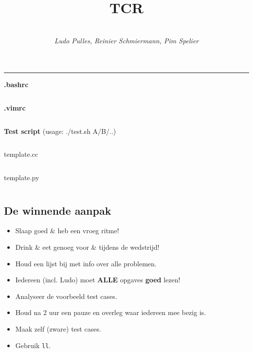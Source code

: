 \documentclass[8pt,a4paper,landscape,oneside]{amsart}
\title{TCR}
\subtitle{\textbf{\QQ} \\ \textit{Ludo Pulles, Reinier Schmiermann, Pim Spelier}}
\newcommand{\mintedstyle}[2]{\inputminted[fontsize=\normalsize,baselinestretch=.9,breaklines,breakautoindent,tabsize=2]{#1}{code/#2}}
\newcommand{\code}[1]{\mintedstyle{cpp}{#1}}
\newenvironment{myitemize}
{\begin{itemize}[leftmargin=.3cm]
	\setlength{\itemsep}{0pt}
	\setlength{\parskip}{0pt}
	\setlength{\parsep}{0pt}     }
{ \end{itemize}                  }
\begin{document}
\begin{multicols*}{3}
\maketitle
\begin{comment}
\begin{center}
	\makeatletter
	\textbf{\@title} \\
	\emph{\@author}
	\makeatother
\end{center}
\end{comment}


\tableofcontents

\begin{center}
\noindent\rule{\columnwidth}{0.4pt}
\end{center}

\begin{center}
\textbf{.bashrc}
\end{center}
\mintedstyle{bash}{.bashrc}

\begin{center}
\textbf{.vimrc}
\end{center}
\mintedstyle{vim}{.vimrc}

\textbf{Test script} (usage: ./test.sh A/B/..)
\mintedstyle{bash}{test.sh}

\begin{center}
template.cc
\end{center}

\code{T.cpp}

\begin{center}
template.py
\end{center}

\mintedstyle{python}{python.py}

\subsection{De winnende aanpak}

\begin{myitemize}
	\item Slaap goed \& heb een vroeg ritme!
	\item Drink \& eet genoeg voor \& tijdens de wedstrijd!
	\item Houd een lijst bij met info over alle problemen.
	\item Iedereen (incl. Ludo) moet {\huge\textbf{ALLE}} opgaves \textbf{goed} lezen!
	\item Analyseer de voorbeeld test cases.
	\item Houd na 2 uur een pauze en overleg waar iedereen mee bezig is.
	\item Maak zelf (zware) test cases.
	\item Gebruik \texttt{ll}.
\end{myitemize}


\end{multicols*}
\end{document}
